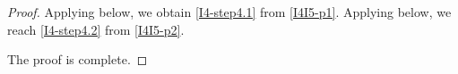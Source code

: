 \documentclass[10pt,a4paper]{amsart}
\begin{document}
\begin{proof}
Applying  below, we obtain \eqref{I4-step4.1} from \eqref{I4I5-p1}. Applying  below, we reach \eqref{I4-step4.2} from \eqref{I4I5-p2}. 

\medskip 
The proof is complete.  
\end{proof}
\end{document}

